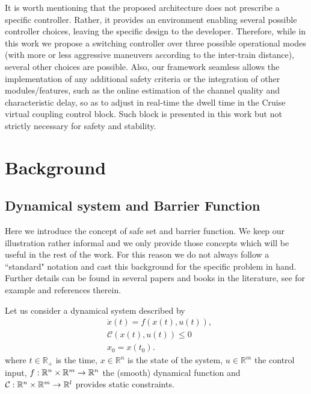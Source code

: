 It is worth mentioning that the proposed architecture does not prescribe a specific controller. Rather, it provides an environment enabling several possible controller choices, leaving the specific design to the developer. 
Therefore, while in this work we propose a switching controller over three possible operational modes (with more or less aggressive maneuvers according to the inter-train distance), several other choices are possible. 
Also, our framework seamless allows the implementation of any additional safety criteria or the integration of other modules/features, such as the online estimation of the channel quality and characteristic delay, so as to adjust in real-time the dwell time in the Cruise virtual coupling control block. Such block is presented in this work but not strictly necessary for safety and stability. 







\section{Background}
\label{sec:Background}




\subsection{Dynamical system and Barrier Function}
\label{subsec:barrier}

Here we introduce the concept of safe set and barrier function. We keep our illustration rather informal and we only provide those concepts which will be useful in the rest of the work. For this reason we do not always follow a ``standard" notation and cast this background for the specific problem in hand.  Further details can be found in several papers and books in the literature, see for example \cite{belta} and references therein. 


Let us consider a dynamical system described by 
\begin{subequations}\label{eq:dynamical_system}
	\begin{align}
		& \dot{x}(t) = f(x(t), u(t)), \label{eq:dynamics}\\
		& \mathcal{C}(x(t),u(t))\leq 0 \label{eq:constraints}\\
		& x_0=x(t_0). \label{eq:initial_condition}
	\end{align}
\end{subequations}
where $t \in \mathbb{R}_+
$ is the time, \(x \in \mathbb{R}^n\) is the state of the system, \(u \in \mathbb{R}^m\) the control input, $f: \Bbb{R}^n \times\Bbb{R}^m \rightarrow \Bbb{R}^n $ the (smooth) dynamical function and $\mathcal{C}: \Bbb{R}^n \times\Bbb{R}^m \rightarrow \Bbb{R}^l$ provides static constraints. 





